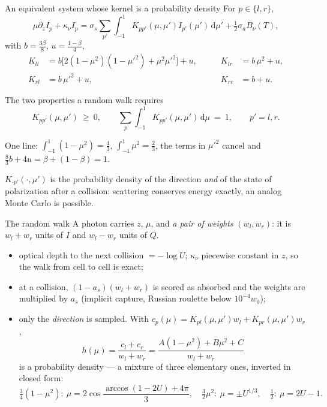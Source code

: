 \documentclass[aspectratio=169,10pt]{beamer}
\renewcommand{\d}{\,\mathrm{d}}
\begin{document}
\begin{frame}{An equivalent system whose kernel is a probability density}
For $p\in\{l,r\}$,
\[
\mu\partial_z I_p+\kappa_\nu I_p=\sigma_s\sum_{p'}\int_{-1}^1K_{pp'}(\mu,\mu')I_{p'}(\mu')\d\mu'
+\tfrac12\sigma_aB_\nu(T),
\]
with $b=\tfrac{3\beta}8$, $u=\tfrac{1-\beta}4$,
\[
\begin{aligned}
K_{ll}&=b\big[2(1-\mu^2)(1-\mu'^2)+\mu^2\mu'^2\big]+u, &\qquad K_{lr}&=b\,\mu^2+u,\\
K_{rl}&=b\,\mu'^2+u,&\qquad K_{rr}&=b+u .
\end{aligned}
\]
\begin{block}{The two properties a random walk requires}
\[
K_{pp'}(\mu,\mu')\ \ge\ 0,\qquad
\sum_{p}\int_{-1}^1K_{pp'}(\mu,\mu')\d\mu\ =\ 1,\qquad p'=l,r .
\]
\end{block}
One line: $\int_{-1}^1(1-\mu^2)=\frac43$, $\int_{-1}^1\mu^2=\frac23$, the terms in
$\mu'^2$ cancel and $\frac83b+4u=\beta+(1-\beta)=1$.
\medskip

$K_{\cdot p'}(\cdot,\mu')$ is the probability density of the direction \emph{and} of the
state of polarization after a collision: scattering conserves energy exactly, an analog
Monte Carlo is possible.
\end{frame}

\begin{frame}{The random walk}
A photon carries $z$, $\mu$, and \emph{a pair of weights} $(w_l,w_r)$:
it is $w_l+w_r$ units of $I$ and $w_l-w_r$ units of $Q$.
\begin{itemize}
\item optical depth to the next collision $=-\log U$; $\kappa_\nu$ piecewise constant in
$z$, so the walk from cell to cell is exact;
\item at a collision, $(1-a_s)(w_l+w_r)$ is scored as absorbed and the weights are
multiplied by $a_s$ (implicit capture, Russian roulette below $10^{-4}w_0$);
\item only the \emph{direction} is sampled. With
$c_p(\mu)=K_{pl}(\mu,\mu')w_l+K_{pr}(\mu,\mu')w_r$,
\[
h(\mu)=\frac{c_l+c_r}{w_l+w_r}=\frac{A(1-\mu^2)+B\mu^2+C}{w_l+w_r}
\]
is a probability density --- a mixture of three elementary ones, inverted in closed form:
\[
\tfrac34(1-\mu^2):\ \mu=2\cos\frac{\arccos(1-2U)+4\pi}{3},\quad
\tfrac32\mu^2:\ \mu=\pm U^{1/3},\quad
\tfrac12:\ \mu=2U-1 .
\]
\end{itemize}
\end{frame}
\end{document}
